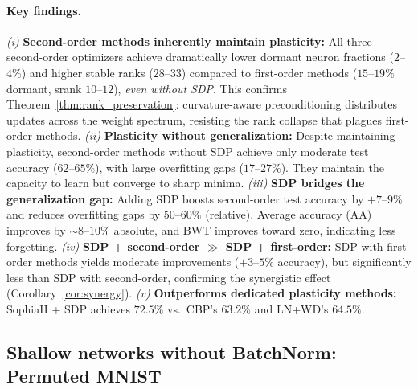 \documentclass{article}
\begin{document}
\paragraph{Key findings.}
\emph{(i)} \textbf{Second-order methods inherently maintain plasticity:} All three second-order optimizers achieve dramatically lower dormant neuron fractions ($2$--$4\%$) and higher stable ranks ($28$--$33$) compared to first-order methods ($15$--$19\%$ dormant, srank $10$--$12$), \emph{even without SDP}. This confirms Theorem~\ref{thm:rank_preservation}: curvature-aware preconditioning distributes updates across the weight spectrum, resisting the rank collapse that plagues first-order methods.
\emph{(ii)} \textbf{Plasticity without generalization:} Despite maintaining plasticity, second-order methods without SDP achieve only moderate test accuracy ($62$--$65\%$), with large overfitting gaps ($17$--$27\%$). They maintain the capacity to learn but converge to sharp minima.
\emph{(iii)} \textbf{SDP bridges the generalization gap:} Adding SDP boosts second-order test accuracy by $+7$--$9\%$ and reduces overfitting gaps by $50$--$60\%$ (relative). Average accuracy (AA) improves by $\sim8$--$10\%$ absolute, and BWT improves toward zero, indicating less forgetting.
\emph{(iv)} \textbf{SDP + second-order $\gg$ SDP + first-order:} SDP with first-order methods yields moderate improvements ($+3$--$5\%$ accuracy), but significantly less than SDP with second-order, confirming the synergistic effect (Corollary~\ref{cor:synergy}).
\emph{(v)} \textbf{Outperforms dedicated plasticity methods:} SophiaH + SDP achieves $72.5\%$ vs.\ CBP's $63.2\%$ and LN+WD's $64.5\%$.

\subsection{Shallow networks without BatchNorm: Permuted MNIST}
\end{document}
